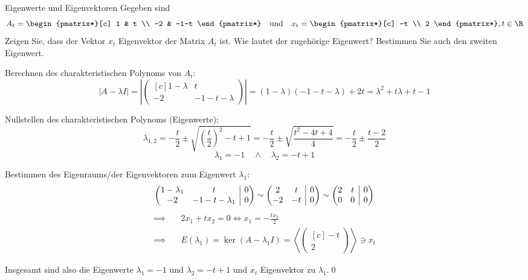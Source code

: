 \documentclass[german]{../spicker}
\makeatletter
\newcommand{\scalarprod}[1]{\left\langle #1 \right\rangle}
\newcommand{\vektor}[1]{\begin{pmatrix*}[c] #1 \end{pmatrix*}}
\renewcommand{\abs}[1]{\left| #1 \right|}
\newenvironment{sysmatrix}[1]
 {\left(\begin{array}{@{}#1@{}}}
 {\end{array}\right)}
\makeatother
\begin{document}
\begin{example}{Eigenwerte und Eigenvektoren}
    Gegeben sind
    $$
        A_t = \vektor{1 & t \\ -2 & -1-t} \quad \text{und} \quad x_t = \vektor{-t \\ 2}, t \in \R
    $$
    Zeigen Sie, dass der Vektor $x_t$ Eigenvektor der Matrix $A_t$ ist.
    Wie lautet der zugehörige Eigenwert?
    Bestimmen Sie auch den zweiten Eigenwert.

    \exampleseparator

    Berechnen des charakteristischen Polynoms von $A_t$:
    $$
        \abs{A - \lambda I} = \abs{\vektor{1 - \lambda & t \\ -2  & -1-t-\lambda}} = (1-\lambda)(-1-t-\lambda) + 2t = \lambda^2 + t\lambda + t - 1
    $$

    Nullstellen des charakteristischen Polynoms (Eigenwerte):
    $$
        \lambda_{1,2} = -\frac{t}{2} \pm \sqrt{\left(\frac{t}{2}\right)^2 - t + 1} = -\frac{t}{2} \pm \sqrt{\frac{t^2-4t + 4}{4}} = -\frac{t}{2} \pm \frac{t-2}{2}
    $$
    $$
        \lambda_1 = -1 \quad \land \quad \lambda_2 = -t +1
    $$

    Bestimmen des Eigenraums/der Eigenvektoren zum Eigenwert $\lambda_1$:
    $$
        \begin{sysmatrix}{cc|c}
            1-\lambda_1 & t & 0 \\
            -2 & -1-t-\lambda_1 & 0
        \end{sysmatrix}
        \sim
        \begin{sysmatrix}{cc|c}
            2 & t & 0 \\
            -2 & -t & 0
        \end{sysmatrix}
        \sim
        \begin{sysmatrix}{cc|c}
            2 & t & 0 \\
            0 & 0 & 0
        \end{sysmatrix}
    $$
    $$
        \begin{aligned}
            \implies \quad & 2x_1 + tx_2 = 0 \iff x_1 = -\frac{tx_2}{2}                  \\
            \implies \quad & E(\lambda_1) = \ker(A-\lambda_1 I) = \scalarprod{\vektor{-t \\ 2}} \ni x_t
        \end{aligned}
    $$

    Insgesamt sind also die Eigenwerte $\lambda_1 = -1$ und $\lambda_2 = -t+1$ und $x_t$ Eigenvektor zu $\lambda_1$.\qed
\end{example}
\end{document}
